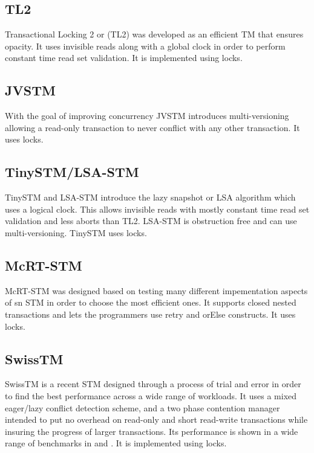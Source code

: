 \subsection{TL2}
Transactional Locking 2 or (TL2) \cite{Dice06transactionallocking} was developed as an efficient TM that ensures opacity.
It uses invisible reads along with a global clock in order to perform constant time read set validation.
It is implemented using locks.

\subsection{JVSTM}
With the goal of improving concurrency JVSTM \cite{1228566} introduces multi-versioning allowing a read-only transaction to never conflict with any other transaction.
It uses locks.

\subsection{TinySTM/LSA-STM}
TinySTM and LSA-STM \cite{10.1109/TPDS.2010.49} introduce the lazy snapshot or LSA algorithm which uses a logical clock.
This allows invisible reads with mostly constant time read set validation and less aborts than TL2.
LSA-STM is obstruction free and can use multi-versioning.
TinySTM uses locks.

\subsection{McRT-STM}
McRT-STM \cite{1123001} was designed based on testing many different impementation aspects of sn STM in order to choose the most efficient ones.
It supports closed nested transactions and lets the programmers use retry and orElse constructs.
It uses locks.

\subsection{SwissTM}
SwissTM \cite{1542494} is a recent STM designed through a process of trial and error in order to find the best performance across a wide range of workloads.
It uses a mixed eager/lazy conflict detection scheme, and a two phase contention manager intended to put no overhead on read-only and short read-write transactions while insuring the progress of larger transactions.
Its performance is shown in a wide range of benchmarks in \cite{LPD-REPORT-2009-003} and \cite{1542494}.
It is implemented using locks.

